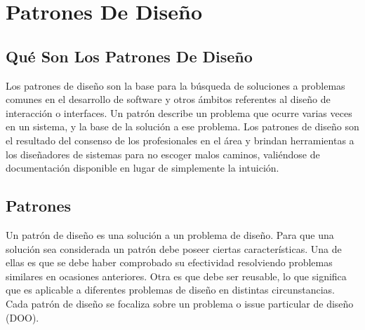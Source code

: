 \chapter{Patrones De Dise\~no}
	\section{Qu\'e Son Los Patrones De Dise\~no}
		Los patrones de dise\~no son la base para la b\'usqueda de soluciones a problemas comunes en el desarrollo de software y otros \'ambitos referentes al 
		dise\~no de interacci\'on o interfaces.
		Un patr\'on describe un problema que ocurre varias veces en un sistema, y la base de la soluci\'on a ese problema.
		Los patrones de dise\~no son el resultado del consenso de los profesionales en el \'area y brindan herramientas a los dise\~nadores de sistemas para no 
		escoger	malos caminos, vali\'endose de documentaci\'on disponible en lugar de simplemente la intuici\'on.
		
	\section{Patrones}
		Un patr\'on de dise\~no es una soluci\'on a un problema de dise\~no. Para que una soluci\'on sea considerada un patr\'on debe poseer ciertas 
		caracter\'isticas. Una de ellas es que se debe haber comprobado su efectividad resolviendo problemas similares en ocasiones anteriores. Otra es que debe 
		ser reusable, lo que significa que es aplicable a diferentes problemas de dise\~no en distintas circunstancias.
		Cada patr\'on de dise\~no se focaliza sobre un problema o issue particular de dise\~no (DOO).
		
